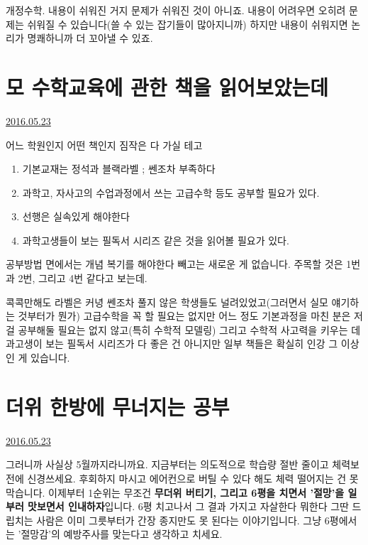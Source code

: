 개정수학.
내용이 쉬워진 거지 문제가 쉬워진 것이 아니죠. 내용이 어려우면 오히려 문제는 쉬워질 수 있습니다(쓸 수 있는 잡기들이 많아지니까)
하지만 내용이 쉬워지면 논리가 명쾌하니까 더 꼬아낼 수 있죠.
\vspace{5mm}







\section{모 수학교육에 관한 책을 읽어보았는데}
\href{https://www.kockoc.com/Apoc/788825}{2016.05.23}

\vspace{5mm}

어느 학원인지 어떤 책인지 짐작은 다 가실 테고
\vspace{5mm}
\begin{enumerate}
    \item 기본교재는 정석과 블랙라벨 ; 쎈조차 부족하다
    \item 과학고, 자사고의 수업과정에서 쓰는 고급수학 등도 공부할 필요가 있다.
    \item 선행은 실속있게 해야한다
    \item 과학고생들이 보는 필독서 시리즈 같은 것을 읽어볼 필요가 있다.
\end{enumerate}
\vspace{5mm}

공부방법 면에서는 개념 복기를 해야한다 빼고는 새로운 게 없습니다.
주목할 것은 1번과 2번, 그리고 4번 같다고 보는데.
\vspace{5mm}

콕콕만해도 라벨은 커녕 쎈조차 풀지 않은 학생들도 널려있었고(그러면서 실모 얘기하는 것부터가 뭔가)
고급수학을 꼭 할 필요는 없지만 어느 정도 기본과정을 마친 분은 저걸 공부해둘 필요는 없지 않고(특히 수학적 모델링)
그리고 수학적 사고력을 키우는 데 과고생이 보는 필독서 시리즈가 다 좋은 건 아니지만 일부 책들은 확실히 인강 그 이상인 게 있습니다.
\vspace{5mm}



\section{더위 한방에 무너지는 공부}
\href{https://www.kockoc.com/Apoc/789055}{2016.05.23}

\vspace{5mm}

그러니까 사실상 5월까지라니까요.
지금부터는 의도적으로 학습량 절반 줄이고 체력보전에 신경쓰세요. 후회하지 마시고
에어컨으로 버틸 수 있다 해도 체력 떨어지는 건 못 막습니다.
이제부터 1순위는 무조건 \textbf{무더위 버티기, 그리고 6평을 치면서 '절망'을 일부러 맛보면서 인내하자}입니다.
6평 치고나서 그 결과 가지고 자살한다 뭐한다 그딴 드립치는 사람은 이미 그릇부터가 간장 종지만도 못 된다는 이야기입니다.
그냥 6평에서는 '절망감'의 예방주사를 맞는다고 생각하고 치세요.
\vspace{5mm}

